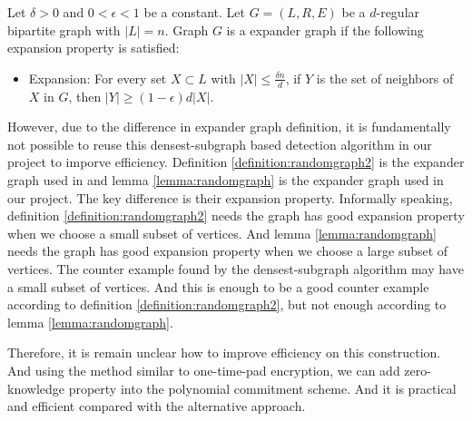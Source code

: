 \begin{definition}
\label{definition:randomgraph2}

Let $\delta > 0$ and $0 < \epsilon < 1$ be a constant. Let $G=(L, R, E)$ be a $d$-regular bipartite graph with $|L| = n$. Graph $G$ is a expander graph if the following expansion property is satisfied:

    \begin{itemize}
        \item Expansion: For every set $X \subset L$ with $|X| \le \frac{\delta n}{d}$, if $Y$ is the set of neighbors of $X$ in $G$, then $|Y| \ge (1 - \epsilon) d |X|$.
    \end{itemize}

\end{definition}

However, due to the difference in expander graph definition, it is fundamentally not possible to reuse this densest-subgraph based detection algorithm in our project to imporve efficiency. Definition \ref{definition:randomgraph2} is the expander graph used in \cite{orion} and lemma \ref{lemma:randomgraph} is the expander graph used in our project. The key difference is their expansion property. Informally speaking, definition \ref{definition:randomgraph2} needs the graph has good expansion property when we choose a small subset of vertices. And lemma \ref{lemma:randomgraph} needs the graph has good expansion property when we choose a large subset of vertices. The counter example found by the densest-subgraph algorithm may have a small subset of vertices. And this is enough to be a good counter example according to definition \ref{definition:randomgraph2}, but not enough according to lemma \ref{lemma:randomgraph}.

Therefore, it is remain unclear how to improve efficiency on this construction. And using the method similar to one-time-pad encryption, we can add zero-knowledge property into the polynomial commitment scheme. And it is practical and efficient compared with the alternative approach.